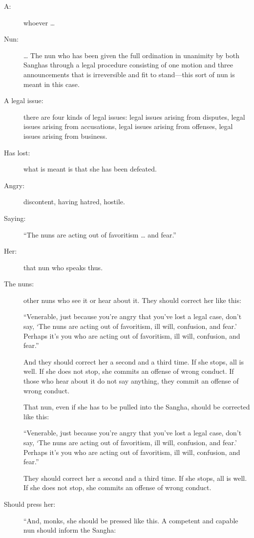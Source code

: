 \documentclass[12pt,openany]{book}%
\begin{document}
\begin{description}%
\item[A: ] whoever … %
\item[Nun: ] … The nun who has been given the full ordination in unanimity by both Sanghas through a legal procedure consisting of one motion and three announcements that is irreversible and fit to stand—this sort of nun is meant in this case. %
\item[A legal issue: ] there are four kinds of legal issues: legal issues arising from disputes, legal issues arising from accusations, legal issues arising from offenses, legal issues arising from business. %
\item[Has lost: ] what is meant is that she has been defeated. %
\item[Angry: ] discontent, having hatred, hostile. %
\item[Saying: ] “The nuns are acting out of favoritism … and fear.” %
\item[Her: ] that nun who speaks thus. %
\item[The nuns: ] other nuns who see it or hear about it. They should correct her like this: 

“Venerable, just because you’re angry that you’ve lost a legal case, don’t say, ‘The nuns are acting out of favoritism, ill will, confusion, and fear.’ Perhaps it’s you who are acting out of favoritism, ill will, confusion, and fear.” 

And they should correct her a second and a third time. If she stops, all is well. If she does not stop, she commits an offense of wrong conduct. If those who hear about it do not say anything, they commit an offense of wrong conduct. 

That nun, even if she has to be pulled into the Sangha, should be corrected like this: 

“Venerable, just because you’re angry that you’ve lost a legal case, don’t say, ‘The nuns are acting out of favoritism, ill will, confusion, and fear.’ Perhaps it’s you who are acting out of favoritism, ill will, confusion, and fear.” 

They should correct her a second and a third time. If she stops, all is well. If she does not stop, she commits an offense of wrong conduct. 

%
\item[Should press her: ] “And, monks, she should be pressed like this. A competent and capable nun should inform the Sangha: 


\end{description}
\end{document}
